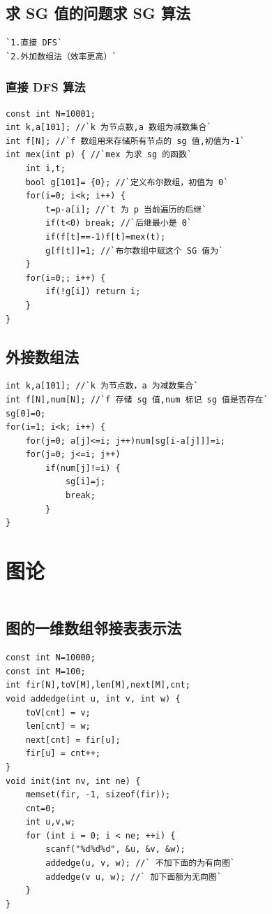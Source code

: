 \documentclass[a4paper]{article}
\begin{document}
\begin{CJK*}{UTF8}{gbsn}
\begin{multicols}{3}
\begin{flushleft}
\subsection{求 SG 值的问题求 SG 算法}
\begin{lstlisting}
`1.直接 DFS`
`2.外加数组法（效率更高）`
\end{lstlisting}

\subsubsection{直接 DFS 算法}
\begin{lstlisting}
const int N=10001;
int k,a[101]; //`k 为节点数,a 数组为减数集合`
int f[N]; //`f 数组用来存储所有节点的 sg 值,初值为-1`
int mex(int p) { //`mex 为求 sg 的函数`
    int i,t;
    bool g[101]= {0}; //`定义布尔数组，初值为 0`
    for(i=0; i<k; i++) {
        t=p-a[i]; //`t 为 p 当前遍历的后继`
        if(t<0) break; //`后继最小是 0`
        if(f[t]==-1)f[t]=mex(t);
        g[f[t]]=1; //`布尔数组中赋这个 SG 值为`
    }
    for(i=0;; i++) {
        if(!g[i]) return i;
    }
}
\end{lstlisting}

\subsection{外接数组法}
\begin{lstlisting}
int k,a[101]; //`k 为节点数，a 为减数集合`
int f[N],num[N]; //`f 存储 sg 值,num 标记 sg 值是否存在`
sg[0]=0;
for(i=1; i<k; i++) {
    for(j=0; a[j]<=i; j++)num[sg[i-a[j]]]=i;
    for(j=0; j<=i; j++)
        if(num[j]!=i) {
            sg[i]=j;
            break;
        }
}
\end{lstlisting}

\section{图论}
\begin{lstlisting}
\end{lstlisting}

\subsection{图的一维数组邻接表表示法}
\begin{lstlisting}
const int N=10000;
const int M=100;
int fir[N],toV[M],len[M],next[M],cnt;
void addedge(int u, int v, int w) {
    toV[cnt] = v;
    len[cnt] = w;
    next[cnt] = fir[u];
    fir[u] = cnt++;
}
void init(int nv, int ne) {
    memset(fir, -1, sizeof(fir));
    cnt=0;
    int u,v,w;
    for (int i = 0; i < ne; ++i) {
        scanf("%d%d%d", &u, &v, &w);
        addedge(u, v, w); //` 不加下面的为有向图`
        addedge(v u, w); //` 加下面额为无向图`
    }
}
\end{lstlisting}


\end{flushleft}
\end{multicols}
\end{CJK*}
\end{document}
